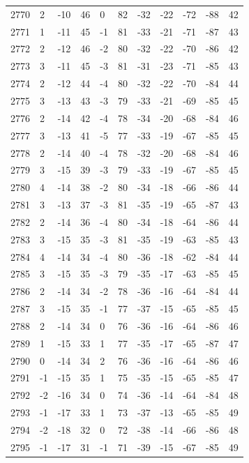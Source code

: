 \begin{table}[H]
\begin{tabular}{lllllllllll}
2770 & 2 & -10 & 46 & 0 & 82 & -32 & -22 & -72 & -88 & 42 \\
2771 & 1 & -11 & 45 & -1 & 81 & -33 & -21 & -71 & -87 & 43 \\
2772 & 2 & -12 & 46 & -2 & 80 & -32 & -22 & -70 & -86 & 42 \\
2773 & 3 & -11 & 45 & -3 & 81 & -31 & -23 & -71 & -85 & 43 \\
2774 & 2 & -12 & 44 & -4 & 80 & -32 & -22 & -70 & -84 & 44 \\
2775 & 3 & -13 & 43 & -3 & 79 & -33 & -21 & -69 & -85 & 45 \\
2776 & 2 & -14 & 42 & -4 & 78 & -34 & -20 & -68 & -84 & 46 \\
2777 & 3 & -13 & 41 & -5 & 77 & -33 & -19 & -67 & -85 & 45 \\
2778 & 2 & -14 & 40 & -4 & 78 & -32 & -20 & -68 & -84 & 46 \\
2779 & 3 & -15 & 39 & -3 & 79 & -33 & -19 & -67 & -85 & 45 \\
2780 & 4 & -14 & 38 & -2 & 80 & -34 & -18 & -66 & -86 & 44 \\
2781 & 3 & -13 & 37 & -3 & 81 & -35 & -19 & -65 & -87 & 43 \\
2782 & 2 & -14 & 36 & -4 & 80 & -34 & -18 & -64 & -86 & 44 \\
2783 & 3 & -15 & 35 & -3 & 81 & -35 & -19 & -63 & -85 & 43 \\
2784 & 4 & -14 & 34 & -4 & 80 & -36 & -18 & -62 & -84 & 44 \\
2785 & 3 & -15 & 35 & -3 & 79 & -35 & -17 & -63 & -85 & 45 \\
2786 & 2 & -14 & 34 & -2 & 78 & -36 & -16 & -64 & -84 & 44 \\
2787 & 3 & -15 & 35 & -1 & 77 & -37 & -15 & -65 & -85 & 45 \\
2788 & 2 & -14 & 34 & 0 & 76 & -36 & -16 & -64 & -86 & 46 \\
2789 & 1 & -15 & 33 & 1 & 77 & -35 & -17 & -65 & -87 & 47 \\
2790 & 0 & -14 & 34 & 2 & 76 & -36 & -16 & -64 & -86 & 46 \\
2791 & -1 & -15 & 35 & 1 & 75 & -35 & -15 & -65 & -85 & 47 \\
2792 & -2 & -16 & 34 & 0 & 74 & -36 & -14 & -64 & -84 & 48 \\
2793 & -1 & -17 & 33 & 1 & 73 & -37 & -13 & -65 & -85 & 49 \\
2794 & -2 & -18 & 32 & 0 & 72 & -38 & -14 & -66 & -86 & 48 \\
2795 & -1 & -17 & 31 & -1 & 71 & -39 & -15 & -67 & -85 & 49 \\

\end{tabular}
\end{table}
